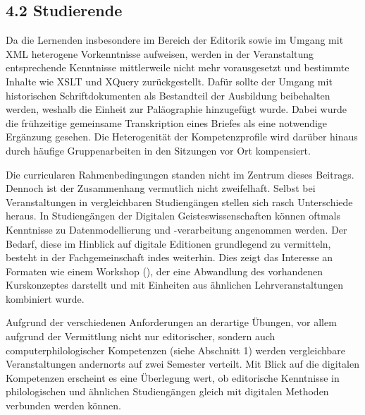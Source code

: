 \documentclass[
          a4paper,
        ]{article}
\begin{document}
\subsection{4.2 Studierende}\label{studierende}

Da die Lernenden insbesondere im Bereich der Editorik sowie im Umgang
mit XML heterogene Vorkenntnisse aufweisen, werden in der Veranstaltung
entsprechende Kenntnisse mittlerweile nicht mehr vorausgesetzt und
bestimmte Inhalte wie XSLT und XQuery zurückgestellt. Dafür sollte der
Umgang mit historischen Schriftdokumenten als Bestandteil der Ausbildung
beibehalten werden, weshalb die Einheit zur Paläographie hinzugefügt
wurde. Dabei wurde die frühzeitige gemeinsame Transkription eines
Briefes als eine notwendige Ergänzung gesehen. Die Heterogenität der
Kompetenzprofile wird darüber hinaus durch häufige Gruppenarbeiten in
den Sitzungen vor Ort kompensiert.

Die curricularen Rahmenbedingungen standen nicht im Zentrum dieses
Beitrags. Dennoch ist der Zusammenhang vermutlich nicht zweifelhaft.
Selbst bei Veranstaltungen in vergleichbaren Studiengängen stellen sich
rasch Unterschiede heraus. In Studiengängen der Digitalen
Geisteswissenschaften können oftmals Kenntnisse zu Datenmodellierung und
-verarbeitung angenommen werden. Der Bedarf, diese im Hinblick auf
digitale Editionen grundlegend zu vermitteln, besteht in der
Fachgemeinschaft indes weiterhin. Dies zeigt das Interesse an Formaten
wie einem Workshop (), der eine Abwandlung des vorhandenen Kurskonzeptes darstellt und
mit Einheiten aus ähnlichen Lehrveranstaltungen kombiniert wurde.

Aufgrund der verschiedenen Anforderungen an derartige Übungen, vor allem
aufgrund der Vermittlung nicht nur editorischer, sondern auch
computerphilologischer Kompetenzen (siehe Abschnitt 1) werden
vergleichbare Veranstaltungen andernorts auf zwei Semester verteilt. Mit
Blick auf die digitalen Kompetenzen erscheint es eine Überlegung wert,
ob editorische Kenntnisse in philologischen und ähnlichen Studiengängen
gleich mit digitalen Methoden verbunden werden können.
\end{document}
